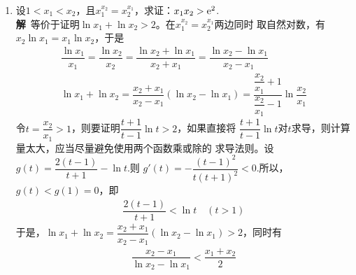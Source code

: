 \begin{enumerate}[label={【\textbf{例\thechapter.\arabic*}】},
 leftmargin=\inteval{\myenumleftmargin}pt,
 itemsep=\inteval{\myenumitempsep}pt,
 itemindent=\inteval{\myenumitemindent}pt]
\item 设$ 1<x_1<x_2 $，且$ x_1^{x_2}=x_2^{x_1} $，求证：$ x_1 x_2>\mathrm{e}^2 $. \\
\textbf{解}\ 等价于证明$\ln x_1+\ln x_2>2 $。在$ x_1^{x_2}=x_2^{x_1} $两边同时
取自然对数，有$ x_2\ln x_1=x_1\ln x_2 $，于是
\begin{gather}
	\dfrac{\ln x_1}{x_1}=\dfrac{\ln x_2}{x_2}=\dfrac{\ln x_2
		+\ln x_1}{x_2+x_1}= \dfrac{\ln x_2-\ln x_1}{x_2-x_1} 
	\label{lnx_x极值偏移1}\\
	\ln x_1+\ln x_2=\dfrac{x_2+x_1}{x_2-x_1}(\ln x_2-\ln x_1)=\dfrac{\dfrac{x_2}{x_1}+1}{\dfrac{x_2}{x_1}-1}
	\ln \dfrac{x_2}{x_1} \label{lnx_x极值偏移2}
\end{gather} 
令$ t=\dfrac{x_2}{x_1}>1 $，则要证明$ \dfrac{t+1}{t-1}\ln t>2 $，如果直接将
$ \dfrac{t+1}{t-1}\ln t $对$ t $求导，则计算量太大，应当尽量避免使用两个函数乘或除的
求导法则。设$ g(t)=\dfrac{2(t-1)}{t+1}-\ln t $.则
$ g'(t)=-\dfrac{(t-1)^2}{t(t+1)^2}<0 $.所以，$ g(t)<g(1)=0 $，即
\begin{align}\label{2(t-1)/(t+1)<lnt}
	\dfrac{2(t-1)}{t+1}<\ln t \quad (t>1)
\end{align}
于是，$\ln x_1+\ln x_2=\dfrac{x_2+x_1}{x_2-x_1}(\ln x_2-\ln x_1)>2 $，同时有
\begin{gather}\label{对数均值不等式右半部分}
	\dfrac{x_2-x_1}{\ln x_2-\ln x_1}<\dfrac{x_1+x_2}{2}
\end{gather}


\end{enumerate}

